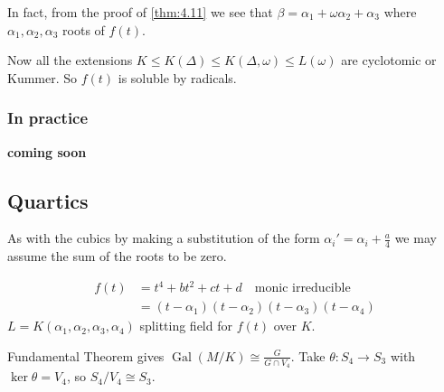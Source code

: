 \documentclass{article}
\DeclareMathOperator{\Gal}{Gal}
\begin{document}
In fact, from the proof of \cref{thm:4.11} we see that $\beta = \alpha_1 + \omega \alpha_2 + \alpha_3$ where $\alpha_1, \alpha_2, \alpha_3$ roots of $f(t)$.

Now all the extensions $K \leq K(\Delta) \leq K(\Delta, \omega) \leq L(\omega)$ are cyclotomic or Kummer.
So $f(t)$ is soluble by radicals.

\subsubsection*{In practice}
\textbf{coming soon}

\subsection*{Quartics}
As with the cubics by making a substitution of the form $\alpha_i' = \alpha_i + \frac{a}{4}$ we may assume the sum of the roots to be zero.

\begin{align*}
    f(t) &= t^4 + b t^2 + ct + d \quad \text{monic irreducible} \\
         &= (t - \alpha_1)(t-\alpha_2)(t-\alpha_3)(t-\alpha_4)
\end{align*}
$L = K(\alpha_1, \alpha_2, \alpha_3, \alpha_4)$ splitting field for $f(t)$ over $K$.

\begin{center}
\end{center}

Fundamental Theorem gives $\Gal(M/K) \cong \frac{G}{G \cap V_4}$.
Take $\theta: S_4 \to S_3$ with $\ker \theta = V_4$, so $S_4 / V_4 \cong S_3$.
\end{document}

